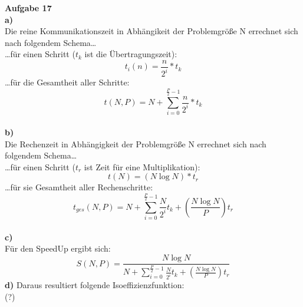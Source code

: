 \documentclass{article}
\begin{document}
{\bf Aufgabe 17}\\
{\bf a)}\\
Die reine Kommunikationszeit in Abhängikeit der Problemgröße N errechnet sich nach folgendem Schema\ldots \\
\ldots für einen Schritt ($t_k$ ist die Übertragungszeit):
$$t_i(n) = \frac{n}{2^i}*t_k$$
\ldots für die Gesamtheit aller Schritte:
$$t(N,P) = N + \sum_{i=0}^{\frac{P}{2}-1}{\frac{n}{2^i}*t_k}$$
\\
{\bf b)}\\
Die Rechenzeit in Abhängigkeit der Problemgröße N errechnet sich nach folgendem Schema\ldots \\
\ldots für einen Schritt ($t_r$ ist Zeit für eine Multiplikation):
$$t(N) = (N\log{N})*t_r$$
\ldots für sie Gesamtheit aller Rechenschritte:
$$t_{ges}(N,P) = N + \sum_{i=0}^{\frac{P}{2}-1}{\frac{N}{2^i}}t_k + (\frac{N\log{N}}{P})t_r$$
\\
{\bf c)}\\
Für den SpeedUp ergibt sich:
$$S(N,P) = \frac{N\log{N}}{N + \sum_{i=0}^{\frac{P}{2}-1}{\frac{N}{2^i}}t_k + (\frac{N\log{N}}{P})t_r}$$
{\bf d)}
Daraus resultiert folgende Isoeffizienzfunktion:\\
(?)
\end{document}
